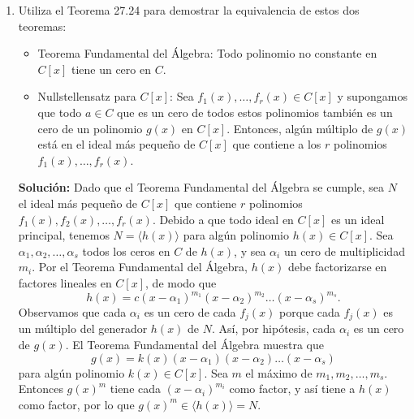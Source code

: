 \begin{enumerate}
    \item Utiliza el Teorema 27.24 para demostrar la equivalencia de estos dos teoremas:
    \begin{itemize}
        \item Teorema Fundamental del Álgebra: Todo polinomio no constante en $C[x]$ tiene un cero en $C$.
        \item Nullstellensatz para $C[x]$: Sea $f_1(x), \dots, f_r(x) \in C[x]$ y supongamos que todo $a \in C$ que es un cero de todos estos polinomios también es un cero de un polinomio $g(x)$ en $C[x]$. Entonces, algún múltiplo de $g(x)$ está en el ideal más pequeño de $C[x]$ que contiene a los $r$ polinomios $f_1(x), \dots, f_r(x)$.
    \end{itemize}
    \textbf{Solución:} Dado que el Teorema Fundamental del Álgebra se cumple, sea $N$ el ideal más pequeño de $C[x]$ que contiene $r$ polinomios $f_1(x), f_2(x), \dots, f_r(x)$. Debido a que todo ideal en $C[x]$ es un ideal principal, tenemos $N = \langle h(x) \rangle$ para algún polinomio $h(x) \in C[x]$. Sea $\alpha_1, \alpha_2, \dots, \alpha_s$ todos los ceros en $C$ de $h(x)$, y sea $\alpha_i$ un cero de multiplicidad $m_i$. Por el Teorema Fundamental del Álgebra, $h(x)$ debe factorizarse en factores lineales en $C[x]$, de modo que
    \[
    h(x) = c(x - \alpha_1)^{m_1}(x - \alpha_2)^{m_2} \dots (x - \alpha_s)^{m_s}.
    \]
    Observamos que cada $\alpha_i$ es un cero de cada $f_j(x)$ porque cada $f_j(x)$ es un múltiplo del generador $h(x)$ de $N$. Así, por hipótesis, cada $\alpha_i$ es un cero de $g(x)$. El Teorema Fundamental del Álgebra muestra que
    \[g(x) = k(x)(x - \alpha_1)(x - \alpha_2) \dots (x - \alpha_s)\]
    para algún polinomio $k(x) \in C[x]$. Sea $m$ el máximo de $m_1, m_2, \dots, m_s$. Entonces $g(x)^m$ tiene cada $(x - \alpha_i)^{m_i}$ como factor, y así tiene a $h(x)$ como factor, por lo que $g(x)^m \in \langle h(x) \rangle = N$.


\end{enumerate}
